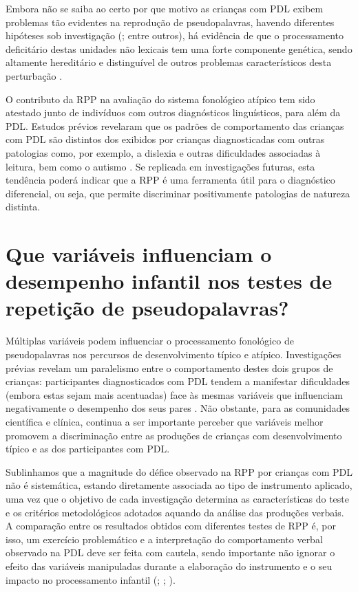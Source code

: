 \documentclass[output=paper,colorlinks,citecolor=brown,booklanguage=portuguese]{langscibook}
\begin{document}
Embora não se saiba ao certo por que motivo as crianças com PDL exibem problemas tão evidentes na reprodução de pseudopalavras, havendo diferentes hipóteses sob investigação (\citealp{Almeida2019, Coady2008, Ferre2015a, Gathercole1990, Gathercole2006, Marshall2003}; entre outros), há evidência de que o processamento deficitário destas unidades não lexicais tem uma forte componente genética, sendo altamente hereditário e distinguível de outros problemas característicos desta perturbação \citep{Bishop1996}.

O contributo da RPP na avaliação do sistema fonológico atípico tem sido atestado junto de indivíduos com outros diagnósticos linguísticos, para além da PDL. Estudos prévios revelaram que os padrões de comportamento das crianças com PDL são distintos dos exibidos por crianças diagnosticadas com outras patologias como, por exemplo, a dislexia \citep{Marshall2009} e outras dificuldades associadas à leitura, bem como o autismo \citep{Williams2013}. Se replicada em investigações futuras, esta tendência poderá indicar que a RPP é uma ferramenta útil para o diagnóstico diferencial, ou seja, que permite discriminar positivamente patologias de natureza distinta.

\section{Que variáveis influenciam o desempenho infantil nos testes de repetição de pseudopalavras?}\label{sec:cap9sec3}
Múltiplas variáveis podem influenciar o processamento fonológico de pseudopala\-vras nos percursos de desenvolvimento típico e atípico. Investigações prévias revelam um paralelismo entre o comportamento destes dois grupos de crianças: participantes diagnosticados com PDL tendem a manifestar dificuldades (embora estas sejam mais acentuadas) face às mesmas variáveis que influenciam negativamente o desempenho dos seus pares \citep{Coady2008, Estes2007}. Não obstante, para as comunidades científica e clínica, continua a ser importante perceber que variáveis melhor promovem a discriminação entre as produções de crianças com desenvolvimento típico e as dos participantes com PDL.

Sublinhamos que a magnitude do défice observado na RPP por crianças com PDL não é sistemática, estando diretamente associada ao tipo de instrumento aplicado, uma vez que o objetivo de cada investigação determina as características do teste e os critérios metodológicos adotados aquando da análise das produções verbais. A comparação entre os resultados obtidos com diferentes testes de RPP é, por isso, um exercício problemático e a interpretação do comportamento verbal observado na PDL deve ser feita com cautela, sendo importante não ignorar o efeito das variáveis manipuladas durante a elaboração do instrumento e o seu impacto no processamento infantil (\citealp{Archibald2006, Gallon2007}; \citealp[189]{Estes2007}; \citealp{Snowling1991}). 
\end{document}
